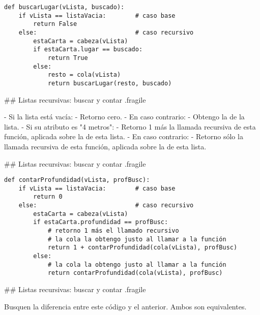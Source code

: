 \pause

\begin{lstlisting}[style=frame02]
def buscarLugar(vLista, buscado):
    if vLista == listaVacia:        # caso base
        return False
    else:                           # caso recursivo
        estaCarta = cabeza(vLista)
        if estaCarta.lugar == buscado:
            return True
        else:
            resto = cola(vLista)
            return buscarLugar(resto, buscado)
\end{lstlisting}

## Listas recursivas: buscar y contar {.fragile}


\vspace{1ex}

- Si la lista está vacía:
    - Retorno cero.
- En caso contrario:
    - Obtengo la  de la lista.
    - Si su atributo   es "4 metros":
        - Retorno 1 más la llamada recursiva de esta función, aplicada sobre la  de esta lista.
    - En caso contrario:
        - Retorno sólo la llamada recursiva de esta función, aplicada sobre la  de esta lista.

## Listas recursivas: buscar y contar {.fragile}


\begin{lstlisting}[style=frame02]
def contarProfundidad(vLista, profBusc):
    if vLista == listaVacia:        # caso base
        return 0
    else:                           # caso recursivo
        estaCarta = cabeza(vLista)
        if estaCarta.profundidad == profBusc:
            # retorno 1 más el llamado recursivo
            # la cola la obtengo justo al llamar a la función
            return 1 + contarProfundidad(cola(vLista), profBusc)
        else:
            # la cola la obtengo justo al llamar a la función
            return contarProfundidad(cola(vLista), profBusc)
\end{lstlisting}

## Listas recursivas: buscar y contar {.fragile}


Busquen la diferencia entre este código y el anterior. Ambos son equivalentes.

